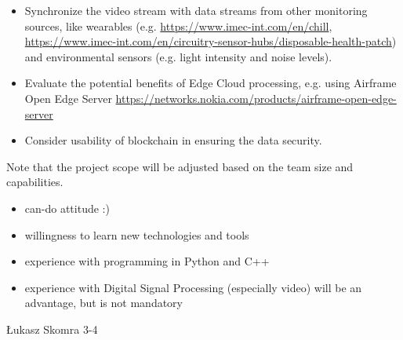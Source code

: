 \begin{project}
{\begin{small}
\begin{itemize}
\begin{itemize}
		\end{itemize}
	\item Synchronize the video stream with data streams from other monitoring sources, like wearables (e.g. \url{https://www.imec-int.com/en/chill}, \url{https://www.imec-int.com/en/circuitry-sensor-hubs/disposable-health-patch}) and environmental sensors (e.g. light intensity and noise levels).
	\item Evaluate the potential benefits of Edge Cloud processing, e.g. using Airframe Open Edge Server \url{https://networks.nokia.com/products/airframe-open-edge-server}
	\item Consider usability of blockchain in ensuring the data security.
\end{itemize}

Note that the project scope will be adjusted based on the team size and capabilities.
\end{small}
}
{
\begin{small}
\begin{itemize}
	\item can-do attitude :)
	\item willingness to learn new technologies and tools
	\item experience with programming in Python and C++
	\item experience with Digital Signal Processing (especially video) will be an advantage, but is not mandatory
\end{itemize}
\end{small}
}
{Łukasz Skomra}
{3-4}
\end{project}
